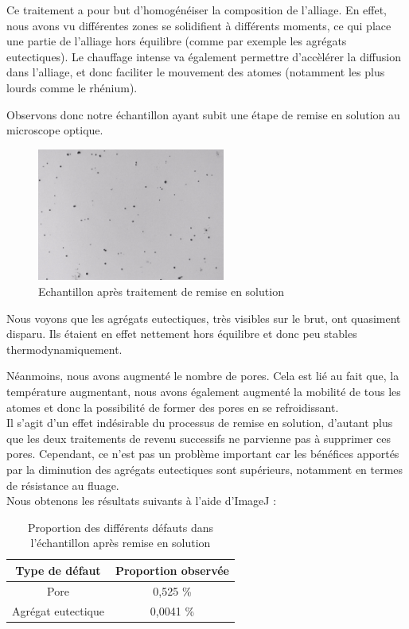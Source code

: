 Ce traitement a pour but d'homogénéiser la composition de l'alliage. En effet, nous avons 
vu différentes zones se solidifient à différents moments, ce qui place une partie de l'alliage
hors équilibre (comme par exemple les agrégats eutectiques). Le chauffage intense va également 
permettre d'accèlérer la diffusion dans l'alliage, et donc faciliter le mouvement des atomes 
(notamment les plus lourds comme le rhénium). 

Observons donc notre échantillon ayant subit une étape de remise en solution au microscope optique.

\begin{figure}[H]
    \centering
    \includegraphics[width=0.55\textwidth]{images_optique/res.pdf}
    \caption{Echantillon après traitement de remise en solution}
    \label{fig:RES_optique}
\end{figure}

Nous voyons que les agrégats eutectiques, très visibles sur le brut, ont quasiment disparu.
Ils étaient en effet nettement hors équilibre et donc peu stables thermodynamiquement. 

Néanmoins, nous avons augmenté le nombre de pores. Cela est lié au fait que, la température 
augmentant, nous avons également augmenté la mobilité de tous les atomes et donc la possibilité
de former des pores en se refroidissant.\\

Il s'agit d'un effet indésirable du processus de remise en solution, d'autant plus que 
les deux traitements de revenu successifs ne parvienne pas à supprimer ces pores. 
Cependant, ce n'est pas un problème important car les bénéfices apportés par la diminution des 
agrégats eutectiques sont supérieurs, notamment en termes de résistance au fluage. \\

Nous obtenons les résultats suivants à l'aide d'ImageJ :

\begin{table}[H]
    \centering
    \caption{Proportion des différents défauts dans l'échantillon après remise en solution}
    \begin{tabular}{|c|c|}
        \hline
        \textbf{Type de défaut}  & \textbf{Proportion observée}  \\
        \hline
        Pore               & 0,525  \% \\
        Agrégat eutectique & 0,0041 \% \\
        \hline
    \end{tabular}
    \label{fig:proportion_defauts_RES}
\end{table}

